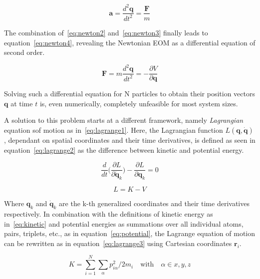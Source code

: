 \documentclass[12pt]{article}
\begin{document}
\begin{equation}
  \textbf{a} = \frac{d^2\textbf{q}}{d t^2} = \frac{\textbf{F}}{m}
  \label{eq:newton2}
\end{equation}

\bigskip

\noindent The combination of~\ref{eq:newton2} and~\ref{eq:newton3} finally leads to equation~\ref{eq:newton4}, revealing the Newtonian EOM as a differential equation of second order.

\begin{equation}
  \mathbf{F} = m\frac{d^2\mathbf{q}}{d t^2} = -\frac{\partial V}{\partial\textbf{q}}
  \label{eq:newton4}
\end{equation}

\bigskip

\noindent Solving such a differential equation for N particles to obtain their position vectors $\textbf{q}$ at time $t$ is, even numerically, completely unfeasible for most system sizes.
\\ \par \noindent A solution to this problem starts at a different framework, namely \textit{Lagrangian} equation sof motion as in~\ref{eq:lagrange1}. Here, the Lagrangian function $L(\textbf{q}, \dot{\textbf{q}})$, dependant on spatial coordinates and their time derivatives, is defined as seen in equation~\ref{eq:lagrange2} as the difference between kinetic and potential energy.

\begin{equation}
  \frac{d}{dt}\Biggl(\frac{\partial L}{\partial \dot{\textbf{q}}_k}\Biggr) - \frac{\partial L}{\partial \textbf{q}_k} = 0
  \label{eq:lagrange1}
\end{equation}

\begin{equation}
  L = K - V
  \label{eq:lagrange2}
\end{equation}

\bigskip

\noindent Where $\textbf{q}_k$ and $\dot{\textbf{q}}_k$ are the k-th generalized coordinates and their time derivatives respectively. In combination with the definitions of kinetic energy as in~\ref{eq:kinetic} and potential energies as summations over all individual atoms, pairs, triplets, etc., as in equation~\ref{eq:potential}, the Lagrange equation of motion can be rewritten as in equation~\ref{eq:lagrange3} using Cartesian coordinates $\textbf{r}_i$.

\begin{equation}
  K = \sum_{i = 1}^{N}\sum_{\alpha}^{}p_{i\alpha}^2/2m_i \quad \text{with}\quad \alpha \in x, y, z
  \label{eq:kinetic}
\end{equation}
\end{document}
